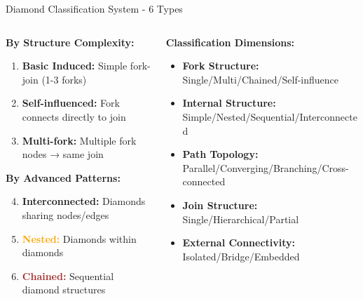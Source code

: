 \documentclass[aspectratio=169]{beamer}
\begin{document}
\begin{frame}{\textcolor{juliared}{Diamond Classification System - 6 Types}}
\begin{columns}
\begin{column}{0.48\textwidth}
\textbf{By Structure Complexity:}
\begin{enumerate}
\item \textcolor{juliagreen}{\textbf{Basic Induced:}} Simple fork-join (1-3 forks)
\item \textcolor{juliablue}{\textbf{Self-influenced:}} Fork connects directly to join
\item \textcolor{juliared}{\textbf{Multi-fork:}} Multiple fork nodes → same join
\end{enumerate}

\vspace{0.3cm}
\textbf{By Advanced Patterns:}
\begin{enumerate}
\setcounter{enumi}{3}
\item \textcolor{juliapurple}{\textbf{Interconnected:}} Diamonds sharing nodes/edges
\item \textcolor{orange}{\textbf{Nested:}} Diamonds within diamonds
\item \textcolor{brown}{\textbf{Chained:}} Sequential diamond structures
\end{enumerate}
\end{column}

\begin{column}{0.52\textwidth}
\textbf{Classification Dimensions:}
\begin{itemize}
\item \textbf{Fork Structure:} Single/Multi/Chained/Self-influence
\item \textbf{Internal Structure:} Simple/Nested/Sequential/Interconnected
\item \textbf{Path Topology:} Parallel/Converging/Branching/Cross-connected
\item \textbf{Join Structure:} Single/Hierarchical/Partial
\item \textbf{External Connectivity:} Isolated/Bridge/Embedded
\end{itemize}


\end{column}
\end{columns}
\end{frame}
\end{document}
